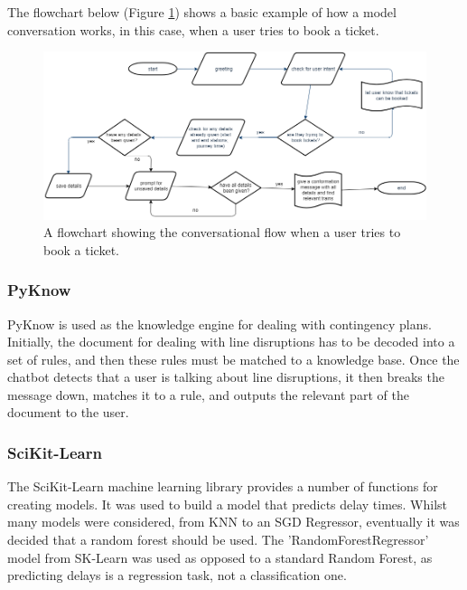 \documentclass[12pt,a4paper]{article}
\begin{document}
    The flowchart below (Figure \ref{fig:overall_flowchart}) shows a basic example of how a model conversation works, in this case, when a user tries to book a ticket.
    
    \begin{figure}[H]
        \centering
        \includegraphics[scale=0.4]{Images/flowchart_overall.png}
        \caption{A flowchart showing the conversational flow when a user tries to book a ticket.}
        \label{fig:overall_flowchart}
    \end{figure}
    
    \subsubsection*{PyKnow}
    PyKnow is used as the knowledge engine for dealing with contingency plans. Initially, the document for dealing with line disruptions has to be decoded into a set of rules, and then these rules must be matched to a knowledge base. Once the chatbot detects that a user is talking about line disruptions, it then breaks the message down, matches it to a rule, and outputs the relevant part of the document to the user.
    
    \subsubsection*{SciKit-Learn}
    The SciKit-Learn machine learning library provides a number of functions for creating models. It was used to build a model that predicts delay times. Whilst many models were considered, from KNN to an SGD Regressor, eventually it was decided that a random forest should be used. The 'RandomForestRegressor' model from SK-Learn was used as opposed to a standard Random Forest, as predicting delays is a regression task, not a classification one. \\
    
\end{document}
